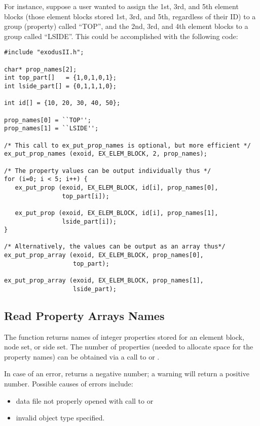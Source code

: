 For instance, suppose a user wanted to assign the 1st, 3rd, and 5th
element blocks (those element blocks stored 1st, 3rd, and 5th,
regardless of their ID) to a group (property) called ``TOP'', and the
2nd, 3rd, and 4th element blocks to a group called ``LSIDE''. This
could be accomplished with the following code:

\begin{lstlisting}
#include "exodusII.h";

char* prop_names[2];
int top_part[]   = {1,0,1,0,1};
int lside_part[] = {0,1,1,1,0};

int id[] = {10, 20, 30, 40, 50};

prop_names[0] = ``TOP'';
prop_names[1] = ``LSIDE'';

/* This call to ex_put_prop_names is optional, but more efficient */
ex_put_prop_names (exoid, EX_ELEM_BLOCK, 2, prop_names);

/* The property values can be output individually thus */
for (i=0; i < 5; i++) {
   ex_put_prop (exoid, EX_ELEM_BLOCK, id[i], prop_names[0], 
                top_part[i]);

   ex_put_prop (exoid, EX_ELEM_BLOCK, id[i], prop_names[1], 
                lside_part[i]);
}

/* Alternatively, the values can be output as an array thus*/
ex_put_prop_array (exoid, EX_ELEM_BLOCK, prop_names[0], 
                   top_part);

ex_put_prop_array (exoid, EX_ELEM_BLOCK, prop_names[1], 
                   lside_part);

\end{lstlisting}


\subsection{Read Property Arrays Names}

The function  returns names of integer
properties stored for an element block, node set, or side set. The
number of properties (needed to allocate space for the property names)
can be obtained via a call to  or
.

In case of an error,  returns a negative
number; a warning will return a positive number.  Possible causes of
errors include:

\begin{itemize}
 \item data file not properly opened with call to 
 or 

 \item invalid object type specified.
\end{itemize}

